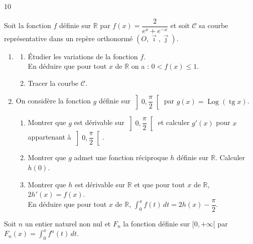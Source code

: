 \documentclass{axiobac}
\begin{document}
\begin{probleme}{10}


Soit la fonction $f$ définie sur $\mathbb{R}$ par $f(x) = \dfrac{2}{e^{x} + e^{-x}}$ et soit $\mathcal{C}$ sa courbe représentative dans un repère orthonormé $(O, \vec{\imath}, \vec{\jmath})$.

\begin{enumerate}
    \item
    \begin{enumerate}
        \item Étudier les variations de la fonction $f$. \\
        En déduire que pour tout $x$ de $\mathbb{R}$ on a : $0 < f(x) \leqslant 1$.
        \item Tracer la courbe $\mathcal{C}$.
    \end{enumerate}
    \item On considère la fonction $g$ définie sur $\left]0, \dfrac{\pi}{2}\right[$ par $g(x) = \operatorname{Log}(\operatorname{tg} x)$.
    \begin{enumerate}
        \item Montrer que $g$ est dérivable sur $\left]0, \dfrac{\pi}{2}\right[$ et calculer $g'(x)$ pour $x$ appartenant à $\left]0, \dfrac{\pi}{2}\right[$.
        \item Montrer que $g$ admet une fonction réciproque $h$ définie sur $\mathbb{R}$. Calculer $h(0)$.
        \item Montrer que $h$ est dérivable sur $\mathbb{R}$ et que pour tout $x$ de $\mathbb{R}$, $2h'(x) = f(x)$. \\
        En déduire que pour tout $x$ de $\mathbb{R}$, $\displaystyle\int_0^x f(t)\,dt = 2h(x) - \dfrac{\pi}{2}$.
    \end{enumerate}
\end{enumerate}


Soit $n$ un entier naturel non nul et $F_n$ la fonction définie sur $[0, +\infty[$ par $F_n(x) = \displaystyle\int_0^x f^n(t)\,dt$.


\end{probleme}
\end{document}
